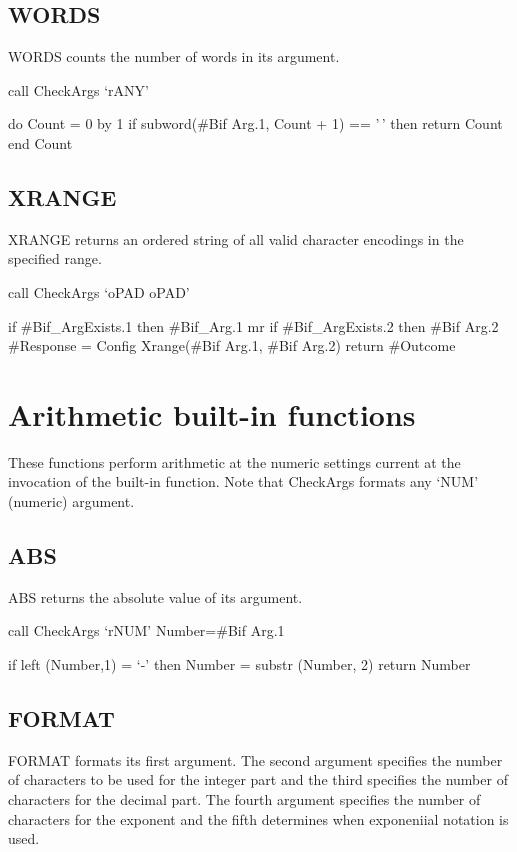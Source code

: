 \hypertarget{words}{%
\subsection{WORDS}\label{words}}

WORDS counts the number of words in its argument.

call CheckArgs `rANY'

do Count = 0 by 1 if subword(\#Bif Arg.1, Count + 1) == '\,' then return
Count end Count

\hypertarget{xrange}{%
\subsection{XRANGE}\label{xrange}}

XRANGE returns an ordered string of all valid character encodings in the
specified range.

call CheckArgs `oPAD oPAD'

if \#Bif\_ArgExists.1 then \#Bif\_Arg.1 mr if \#Bif\_ArgExists.2 then
\#Bif Arg.2 \#Response = Config Xrange(\#Bif Arg.1, \#Bif Arg.2) return
\#Outcome

\hypertarget{arithmetic-built-in-functions}{%
\section{Arithmetic built-in
functions}\label{arithmetic-built-in-functions}}

These functions perform arithmetic at the numeric settings current at
the invocation of the built-in function. Note that CheckArgs formats any
`NUM' (numeric) argument.

\hypertarget{abs}{%
\subsection{ABS}\label{abs}}

ABS returns the absolute value of its argument.

call CheckArgs `rNUM' Number=\#Bif Arg.1

if left (Number,1) = `-' then Number = substr (Number, 2) return Number

\hypertarget{format}{%
\subsection{FORMAT}\label{format}}

FORMAT formats its first argument. The second argument specifies the
number of characters to be used for the integer part and the third
specifies the number of characters for the decimal part. The fourth
argument specifies the number of characters for the exponent and the
fifth determines when exponeniial notation is used.

